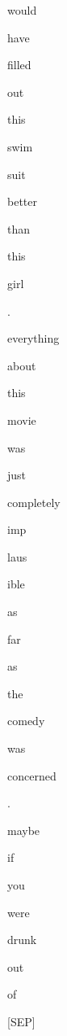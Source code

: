 \documentclass[varwidth=150mm]{standalone}
\begin{document}
\begin{CJK*}{UTF8}{gbsn}
{{{\colorbox{red!2.2655820846557617}{\strut would} \colorbox{red!0.0}{\strut have} \colorbox{red!0.0}{\strut filled} \colorbox{red!0.0}{\strut out} \colorbox{red!7.357064247131348}{\strut this} \colorbox{red!24.42413330078125}{\strut swim}\colorbox{red!8.323887825012207}{\strut suit} \colorbox{red!0.0}{\strut better} \colorbox{red!0.0}{\strut than} \colorbox{red!18.06205177307129}{\strut this} \colorbox{red!0.0}{\strut girl} \colorbox{red!0.0}{\strut .} \colorbox{red!4.751922130584717}{\strut everything} \colorbox{red!3.32043719291687}{\strut about} \colorbox{red!9.437768936157227}{\strut this} \colorbox{red!6.293449401855469}{\strut movie} \colorbox{red!22.570064544677734}{\strut was} \colorbox{red!9.490808486938477}{\strut just} \colorbox{red!5.087355136871338}{\strut completely} \colorbox{red!1.0755491256713867}{\strut imp}\colorbox{red!5.6220703125}{\strut laus}\colorbox{red!6.812630653381348}{\strut ible} \colorbox{red!1.957383394241333}{\strut as} \colorbox{red!1.1928704977035522}{\strut far} \colorbox{red!1.7207882404327393}{\strut as} \colorbox{red!2.943802833557129}{\strut the} \colorbox{red!10.692338943481445}{\strut comedy} \colorbox{red!7.601527214050293}{\strut was} \colorbox{red!1.1549949645996094}{\strut concerned} \colorbox{red!0.0}{\strut .} \colorbox{red!14.029653549194336}{\strut maybe} \colorbox{red!6.79953670501709}{\strut if} \colorbox{red!1.2052116394042969}{\strut you} \colorbox{red!2.087749481201172}{\strut were} \colorbox{red!4.400170803070068}{\strut drunk} \colorbox{red!1.2173359394073486}{\strut out} \colorbox{red!100.0}{\strut of} \colorbox{red!2.24238657951355}{\strut [SEP]}
}}}
\end{CJK*}
\end{document}
